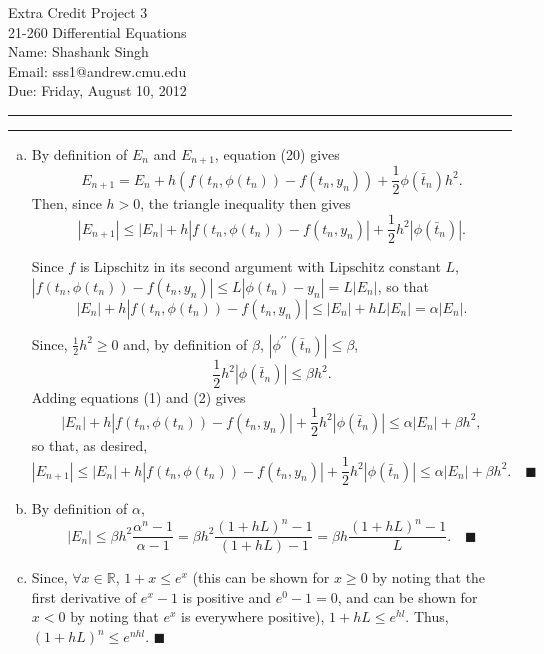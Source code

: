 \documentclass[11pt]{article}
\makeatletter
\newcounter{questionCounter}
\newcounter{partCounter}[questionCounter]
\newenvironment{question}[2][\arabic{questionCounter}]{%
    \setcounter{partCounter}{0}%
    \vspace{.25in} \hrule \vspace{0.5em}%
        \noindent{\bf #2}%
    \vspace{0.8em} \hrule \vspace{.10in}%
    \addtocounter{questionCounter}{1}%
}{}
\newcommand{\myname}{Shashank Singh}
\newcommand{\myandrew}{sss1@andrew.cmu.edu}
\newcommand{\myclass}{21-260 Differential Equations}
\newcommand{\myhwnum}{3}
\newcommand{\duedate}{Friday, August 10, 2012}
\renewcommand{\qed}{\quad $\blacksquare$}
\newcommand{\mqed}{\quad \blacksquare}
\makeatother
\begin{document}
\thispagestyle{plain}

{\Large Extra Credit Project \myhwnum} \\
\myclass \\
Name: \myname \\
Email: \myandrew \\
Due: \duedate \\
\begin{question}{Section 8.1, Problem 23}
\begin{enumerate}[(a)]
\item By definition of $E_n$ and $E_{n + 1}$, equation (20) gives
\[E_{n + 1}
 = E_n + h(f(t_n,\phi(t_n)) - f(t_n,y_n)) + \frac12\phi(\bar{t}_n)h^2.\]
Then, since $h > 0$, the triangle inequality then gives
\[|E_{n + 1}|
 \leq |E_n| + h|f(t_n,\phi(t_n)) - f(t_n,y_n)| + \frac12h^2|\phi(\bar{t}_n)|.\]

Since $f$ is Lipschitz in its second argument with Lipschitz constant $L$,
$|f(t_n,\phi(t_n)) - f(t_n,y_n)| \leq L|\phi(t_n) - y_n| = L|E_n|$, so that
\begin{equation}
|E_n| + h|f(t_n,\phi(t_n)) - f(t_n,y_n)| \leq  |E_n| + hL|E_n| = \alpha|E_n|.
\end{equation}

Since, $\frac12h^2 \geq 0$ and, by definition of $\beta$,
$|\phi^{\prime\prime}(\bar{t}_n)| \leq \beta$,
\begin{equation}
\frac12h^2|\phi(\bar{t}_n)| \leq \beta h^2.
\end{equation}
Adding equations (1) and (2) gives
\[|E_n| + h|f(t_n,\phi(t_n)) - f(t_n,y_n)| + \frac12h^2|\phi(\bar{t}_n)|
 \leq \alpha|E_n| + \beta h^2,
\]
so that, as desired,
\[|E_{n + 1}|
 \leq |E_n| + h|f(t_n,\phi(t_n)) - f(t_n,y_n)| + \frac12h^2|\phi(\bar{t}_n)|
 \leq \alpha|E_n| + \beta h^2. \mqed
\]

\item By definition of $\alpha$,
\[|E_n|
   \leq   \beta h^2\frac{\alpha^n - 1}  {\alpha - 1}
   =      \beta h^2\frac{(1 + hL)^n - 1}{(1 + hL) - 1}
   =      \beta h  \frac{(1 + hL)^n - 1}{L}. \mqed
\]

\item Since, $\forall x \in \mathbb{R}$, $1 + x \leq e^x$ (this can be shown
for $x \geq 0$ by noting that the first derivative of $e^x - 1$ is positive
and $e^0 - 1 = 0$, and can be shown for $x < 0$ by noting that $e^x$ is
everywhere positive), $1 + hL \leq e^{hl}$. Thus, $(1 + hL)^n \leq e^{nhl}$.
\qed
\end{enumerate}
\end{question}
\end{document}
